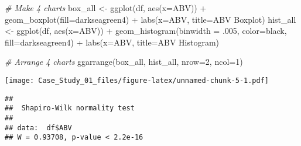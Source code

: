 \documentclass[
]{article}
\newenvironment{Shaded}{\begin{snugshade}}{\end{snugshade}}
\newcommand{\AttributeTok}[1]{\textcolor[rgb]{0.77,0.63,0.00}{#1}}
\newcommand{\CommentTok}[1]{\textcolor[rgb]{0.56,0.35,0.01}{\textit{#1}}}
\newcommand{\DecValTok}[1]{\textcolor[rgb]{0.00,0.00,0.81}{#1}}
\newcommand{\FunctionTok}[1]{\textcolor[rgb]{0.00,0.00,0.00}{#1}}
\newcommand{\NormalTok}[1]{#1}
\newcommand{\OtherTok}[1]{\textcolor[rgb]{0.56,0.35,0.01}{#1}}
\newcommand{\SpecialCharTok}[1]{\textcolor[rgb]{0.00,0.00,0.00}{#1}}
\newcommand{\StringTok}[1]{\textcolor[rgb]{0.31,0.60,0.02}{#1}}
\begin{document}
\begin{Shaded}
\begin{Highlighting}[]
\CommentTok{\# Make 4 charts}
\NormalTok{box\_all }\OtherTok{\textless{}{-}} \FunctionTok{ggplot}\NormalTok{(df, }\FunctionTok{aes}\NormalTok{(}\AttributeTok{x=}\NormalTok{ABV)) }\SpecialCharTok{+} \FunctionTok{geom\_boxplot}\NormalTok{(}\AttributeTok{fill=}\StringTok{\textquotesingle{}darkseagreen4\textquotesingle{}}\NormalTok{) }\SpecialCharTok{+} 
  \FunctionTok{labs}\NormalTok{(}\AttributeTok{x=}\StringTok{\textquotesingle{}ABV\textquotesingle{}}\NormalTok{, }\AttributeTok{title=}\StringTok{\textquotesingle{}ABV Boxplot\textquotesingle{}}\NormalTok{)}
\NormalTok{hist\_all }\OtherTok{\textless{}{-}} \FunctionTok{ggplot}\NormalTok{(df, }\FunctionTok{aes}\NormalTok{(}\AttributeTok{x=}\NormalTok{ABV)) }\SpecialCharTok{+} \FunctionTok{geom\_histogram}\NormalTok{(}\AttributeTok{binwidth =}\NormalTok{ .}\DecValTok{005}\NormalTok{, }\AttributeTok{color=}\StringTok{\textquotesingle{}black\textquotesingle{}}\NormalTok{, }\AttributeTok{fill=}\StringTok{\textquotesingle{}darkseagreen4\textquotesingle{}}\NormalTok{) }\SpecialCharTok{+}
  \FunctionTok{labs}\NormalTok{(}\AttributeTok{x=}\StringTok{\textquotesingle{}ABV\textquotesingle{}}\NormalTok{, }\AttributeTok{title=}\StringTok{\textquotesingle{}ABV Histogram\textquotesingle{}}\NormalTok{)}

\CommentTok{\# Arrange 4 charts}
\FunctionTok{ggarrange}\NormalTok{(box\_all, hist\_all, }\AttributeTok{nrow=}\DecValTok{2}\NormalTok{, }\AttributeTok{ncol=}\DecValTok{1}\NormalTok{)}
\end{Highlighting}
\end{Shaded}

\texttt{[image: Case\_Study\_01\_files/figure-latex/unnamed-chunk-5-1.pdf]}

\begin{Shaded}
\end{Shaded}

\begin{verbatim}
## 
##  Shapiro-Wilk normality test
## 
## data:  df$ABV
## W = 0.93708, p-value < 2.2e-16
\end{verbatim}

\begin{Shaded}
\end{Shaded}
\end{document}
